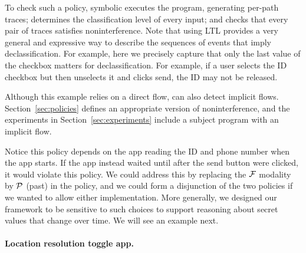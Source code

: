 To check such a policy, \toolname{} symbolic executes the program,
generating per-path traces; determines the classification level of every input; and
checks that every pair of traces satisfies noninterference.
Note that using LTL provides a very general and
expressive way to describe the sequences of events that imply
declassification. For example, here we precisely capture that
only the last value of the checkbox matters for declassification. For
example, if a user selects the ID checkbox but then unselects it
and clicks send, the ID may not be released.

Although this example relies on a direct flow, \toolname{} can also
detect implicit flows. Section~\ref{sec:policies} defines an
appropriate version of noninterference, and the experiments in
Section~\ref{sec:experiments} include a subject program with an
implicit flow.


Notice this policy depends on the app reading the ID
and phone number when the app starts. If the app instead
waited until after the send button were clicked, it would violate this
policy. We could address this by replacing the $\mathcal{F}$ modality by
$\mathcal{P}$ (past) in the policy, and we could form a disjunction of the
two policies if we wanted to allow either implementation. More generally, we
designed our framework to be sensitive to such choices to
support  reasoning about secret
values that change over time. We will see an
example next.

\paragraph*{Location resolution toggle app.}

